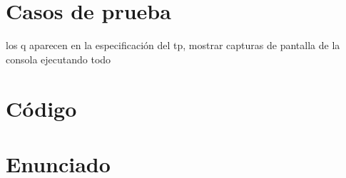 \documentclass{article}
\begin{document}
\section{Casos de prueba}
los q aparecen en la especificación del tp, mostrar capturas de pantalla
de la consola ejecutando todo

\section{Código}


%    

\section{Enunciado}
\end{document}
